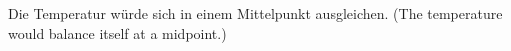 Die Temperatur würde sich in einem Mittelpunkt ausgleichen.  
(The temperature would balance itself at a midpoint.)